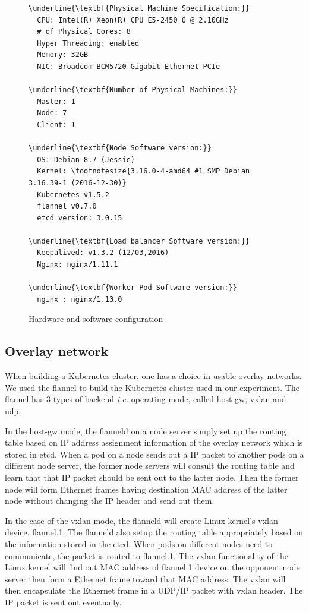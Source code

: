 \begin{figure}
\begin{minipage}{0.9\columnwidth}
\small
\begin{Verbatim}[commandchars=\\\{\}]
\underline{\textbf{Physical Machine Specification:}}
  CPU: Intel(R) Xeon(R) CPU E5-2450 0 @ 2.10GHz
  # of Physical Cores: 8
  Hyper Threading: enabled
  Memory: 32GB
  NIC: Broadcom BCM5720 Gigabit Ethernet PCIe

\underline{\textbf{Number of Physical Machines:}}
  Master: 1
  Node: 7
  Client: 1

\underline{\textbf{Node Software version:}}
  OS: Debian 8.7 (Jessie)
  Kernel: \footnotesize{3.16.0-4-amd64 #1 SMP Debian 3.16.39-1 (2016-12-30)}
  Kubernetes v1.5.2
  flannel v0.7.0
  etcd version: 3.0.15

\underline{\textbf{Load balancer Software version:}}
  Keepalived: v1.3.2 (12/03,2016)
  Nginx: nginx/1.11.1

\underline{\textbf{Worker Pod Software version:}}
  nginx : nginx/1.13.0 
\end{Verbatim}
\end{minipage}
\caption{Hardware and software configuration}
\label{fig:Hardware and software configuration}
\end{figure}


\subsection{Overlay network}

When building a Kubernetes cluster, one has a choice in usable overlay networks.
We used the flannel to build the Kubernetes cluster used in our experiment. 
The flannel has 3 types of backend {\it i.e.} operating mode, called host-gw, vxlan and udp\cite{CoreOSFlannelBackend}.

In the host-gw mode, the flanneld on a node server simply set up the routing table 
based on IP address assignment information of the overlay network which is stored in etcd. 
When a pod on a node sends out a IP packet to another pods on a different node server, 
the former node servers will consult the routing table and learn that that IP packet should be sent out to the latter node.
Then the former node will form Ethernet frames having destination MAC address of the latter node without changing the IP header and send out them.

In the case of the vxlan mode, the flanneld will create Linux kernel's vxlan device, flannel.1. 
The flanneld also setup the routing table appropriately based on the information stored in the etcd.
When pods on different nodes need to communicate, the packet is routed to flannel.1.
The vxlan functionality of the Linux kernel will find out MAC address of flannel.1 device on the opponent node server 
then form a Ethernet frame toward that MAC address.
The vxlan will then encapsulate the Ethernet frame in a UDP/IP packet with vxlan header.
The IP packet is sent out eventually.

